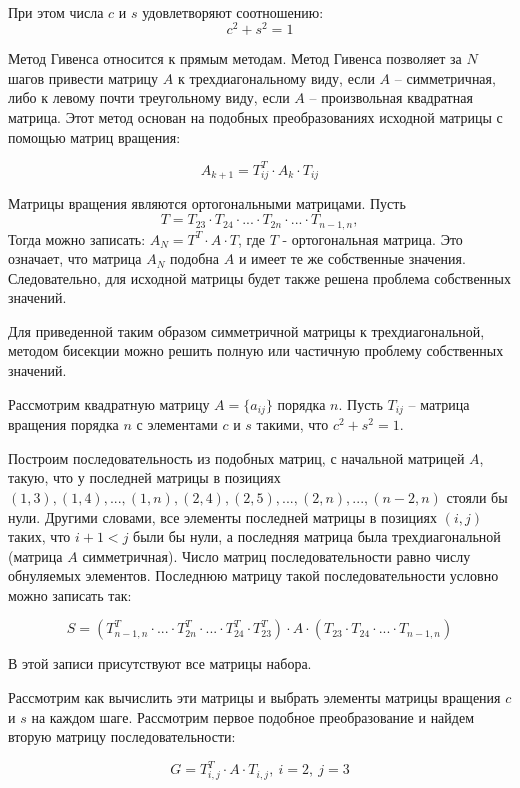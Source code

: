 \documentclass[12pt,a4paper]{article}
\begin{document}
\

При этом числа $c$ и $s$ удовлетворяют соотношению: 
$$ c^2 + s^2 = 1 $$

Метод Гивенса относится к прямым методам. Метод Гивенса позволяет за $N$ шагов привести матрицу $A$ к трехдиагональному виду, если $A$ -- симметричная, либо к левому почти треугольному виду, если $A$ -- произвольная квадратная матрица. Этот метод основан на подобных преобразованиях исходной матрицы с помощью матриц вращения:

$$ A_{k+1} = T_{ij}^T \cdot A_k \cdot T_{ij} $$

Матрицы вращения являются ортогональными матрицами. Пусть 
$$ T = T_{23} \cdot T_{24} \cdot ... \cdot T_{2n} \cdot ... \cdot T_{n-1,n},$$
Тогда можно записать: $ A_N = T^T \cdot A \cdot T $, где $T$ - ортогональная матрица. Это означает, что матрица $A_N$ подобна $A$ и имеет те же собственные значения. Следовательно, для исходной матрицы будет также решена проблема собственных значений.

Для приведенной таким образом симметричной матрицы к трехдиагональной, методом бисекции можно решить полную или частичную проблему собственных значений. 

Рассмотрим квадратную матрицу $A = \{ a_{ij} \}$ порядка $n$. Пусть $T_{ij}$ -- матрица вращения порядка $n$ с элементами $c$ и $s$ такими, что $c^2 + s^2 = 1$. 

Построим последовательность из подобных матриц, с начальной матрицей $A$, такую, что у последней матрицы в позициях $(1,3), (1,4), ..., (1,n), (2,4), (2,5), ..., (2, n), ..., (n-2,n)$ стояли бы нули. Другими словами, все элементы последней матрицы в позициях $(i, j)$ таких, что $i + 1 < j$ были бы нули, а последняя матрица была трехдиагональной (матрица $A$ симметричная). Число матриц последовательности равно числу обнуляемых элементов. Последнюю матрицу такой последовательности условно можно записать так:

$$
 S = 
 (
  T_{n-1,n}^T \cdot ... \cdot T_{2n}^T \cdot ... \cdot T_{24}^T \cdot T_{23}^T
 ) 
 \cdot A \cdot
 (T_{23} \cdot T_{24} \cdot ... \cdot T_{n-1,n})
$$

В этой записи присутствуют все матрицы набора.

Рассмотрим как вычислить эти матрицы и выбрать элементы матрицы вращения $c$ и $s$ на каждом шаге. Рассмотрим первое подобное преобразование и найдем вторую матрицу последовательности:

$$
 G = T_{i,j}^T \cdot A \cdot T_{i,j}, \ i=2, \ j=3
$$
\end{document}

